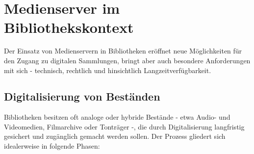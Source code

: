 \documentclass[12pt,a4paper]{report}
\begin{document}
\section{Medienserver im Bibliothekskontext}  
Der Einsatz von Medienservern in Bibliotheken eröffnet neue Möglichkeiten für den Zugang zu digitalen Sammlungen, bringt aber auch besondere Anforderungen mit sich - technisch, rechtlich und hinsichtlich Langzeitverfügbarkeit.

  \subsection{Digitalisierung von Beständen}  
  Bibliotheken besitzen oft analoge oder hybride Bestände - etwa Audio- und Videomedien, Filmarchive oder Tonträger -, die durch Digitalisierung langfristig gesichert und zugänglich gemacht werden sollen. Der Prozess gliedert sich idealerweise in folgende Phasen:
\end{document}

